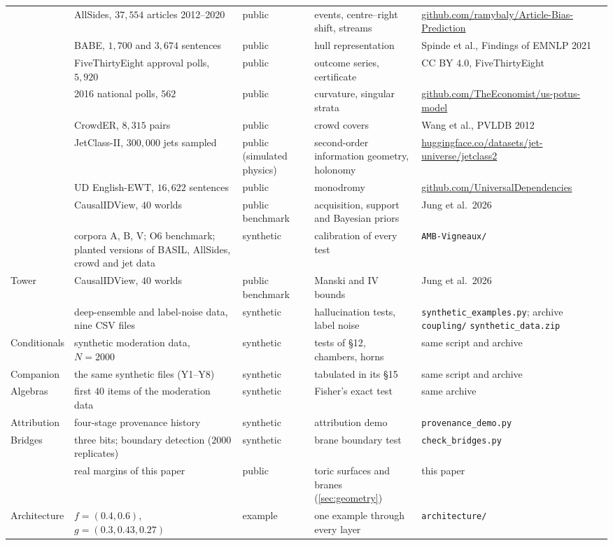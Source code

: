 \documentclass[11pt]{article}
\theoremstyle{definition}
\theoremstyle{remark}
\begin{document}
{\begin{longtable}{>{\raggedright}p{1.7cm}>{\raggedright}p{3.7cm}>{\raggedright}p{1.5cm}>{\raggedright}p{3.9cm}>{\raggedright\arraybackslash}p{4.2cm}}
 & AllSides, $37{,}554$ articles 2012--2020 & public & events, centre--right shift, streams & \url{github.com/ramybaly/Article-Bias-Prediction}\\
 & BABE, $1{,}700$ and $3{,}674$ sentences & public & hull representation & Spinde et al., Findings of EMNLP 2021\\
 & FiveThirtyEight approval polls, $5{,}920$ & public & outcome series, certificate & CC BY 4.0, FiveThirtyEight\\
 & 2016 national polls, $562$ & public & curvature, singular strata & \url{github.com/TheEconomist/us-potus-model}\\
 & CrowdER, $8{,}315$ pairs & public & crowd covers & Wang et al., PVLDB 2012\\
 & JetClass-II, $300{,}000$ jets sampled & public (simulated physics) & second-order information geometry, holonomy & \url{huggingface.co/datasets/jet-universe/jetclass2}\\
 & UD English-EWT, $16{,}622$ sentences & public & monodromy & \url{github.com/UniversalDependencies}\\
 & CausalIDView, $40$ worlds & public benchmark & acquisition, support and Bayesian priors & Jung et al.\ 2026\\
 & corpora A, B, V; O6 benchmark; planted versions of BASIL, AllSides, crowd and jet data & synthetic & calibration of every test & \texttt{AMB-Vigneaux/}\\
Tower & CausalIDView, $40$ worlds & public benchmark & Manski and IV bounds & Jung et al.\ 2026\\
 & deep-ensemble and label-noise data, nine CSV files & synthetic & hallucination tests, label noise & \texttt{synthetic\_examples.py}; archive \texttt{coupling/} \texttt{synthetic\_data.zip}\\
Conditionals & synthetic moderation data, $N=2000$ & synthetic & tests of \S12, chambers, horns & same script and archive\\
Companion & the same synthetic files (Y1--Y8) & synthetic & tabulated in its \S15 & same script and archive\\
Algebras & first $40$ items of the moderation data & synthetic & Fisher's exact test & same archive\\
Attribution & four-stage provenance history & synthetic & attribution demo & \texttt{provenance\_demo.py}\\
Bridges & three bits; boundary detection ($2000$ replicates) & synthetic & brane boundary test & \texttt{check\_bridges.py}\\
 & real margins of this paper & public & toric surfaces and branes (\cref{sec:geometry}) & this paper\\
Architecture & $f=(0.4,0.6)$, $g=(0.3,0.43,0.27)$ & example & one example through every layer & \texttt{architecture/}\\
\end{longtable}}
\end{document}
